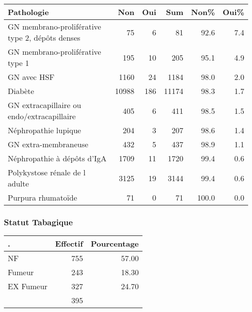 \documentclass[11pt,a4paper]{article}\usepackage[]{graphicx}\usepackage[]{color}
\begin{document}
\begin{table}[H]
\centering
\begin{tabular}{lrrrrr}
  \hline
Pathologie & Non & Oui & Sum & Non\% & Oui\% \\ 
  \hline
GN membrano-proliférative type 2, dépôts denses & 75 &  6 & 81 & 92.6 & 7.4 \\ 
  GN membrano-proliférative type 1 & 195 & 10 & 205 & 95.1 & 4.9 \\ 
  GN avec HSF & 1160 & 24 & 1184 & 98.0 & 2.0 \\ 
  Diabète & 10988 & 186 & 11174 & 98.3 & 1.7 \\ 
  GN extracapillaire ou endo/extracapillaire & 405 &  6 & 411 & 98.5 & 1.5 \\ 
  Néphropathie lupique & 204 &  3 & 207 & 98.6 & 1.4 \\ 
  GN extra-membraneuse & 432 &  5 & 437 & 98.9 & 1.1 \\ 
  Néphropathie à dépôts d'IgA & 1709 & 11 & 1720 & 99.4 & 0.6 \\ 
  Polykystose rénale de l adulte & 3125 & 19 & 3144 & 99.4 & 0.6 \\ 
  Purpura rhumatoïde & 71 &  0 & 71 & 100.0 & 0.0 \\ 
   \hline
\end{tabular}
\end{table}


    \subsubsection{Statut Tabagique}

\begin{table}[ht]
\centering
\begin{tabular}{lrr}
  \hline
. & Effectif & Pourcentage \\ 
  \hline
NF & 755 & 57.00 \\ 
  Fumeur & 243 & 18.30 \\ 
  EX Fumeur & 327 & 24.70 \\ 
   & 395 &  \\ 
   \hline
\end{tabular}
\end{table}
\end{document}
